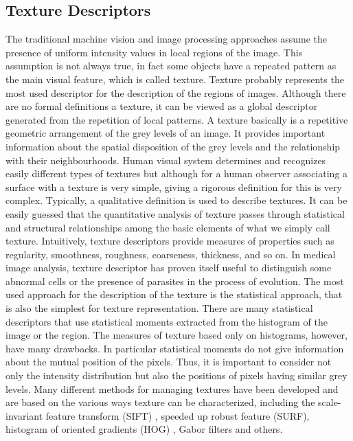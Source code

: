 \documentclass[final,a4paper,12pt,english]{UnicaPhdThesis3}
\begin{document}
\subsection{Texture Descriptors} %
The traditional machine vision and image processing approaches assume the presence of uniform intensity values in local regions of the image. This assumption is not always true, in fact some objects have a repeated pattern as the main visual feature, which is called texture. Texture probably represents the most used descriptor for the description of the regions of images. Although there are no formal definitions a texture, it can be viewed as a global descriptor generated from the repetition of local patterns. A texture basically is a repetitive geometric arrangement of the grey levels of an image. It provides important information about the spatial disposition of the grey levels and the relationship with their neighbourhoods. Human visual system determines and recognizes easily different types of textures but although for a human observer associating a surface with a texture is very simple, giving a rigorous definition for this is very complex. Typically, a qualitative definition is used to describe textures. It can be easily guessed that the quantitative analysis of texture passes through statistical and structural relationships among the basic elements of what we simply call texture. Intuitively, texture descriptors provide measures of properties such as regularity, smoothness, roughness, coarseness, thickness, and so on. In medical image analysis, texture descriptor has proven itself useful to distinguish some abnormal cells or the presence of parasites in the process of evolution. The most used approach for the description of the texture is the statistical approach, that is also the simplest for texture representation. There are many statistical descriptors that use statistical moments extracted from the histogram of the image or the region. The measures of texture based only on histograms, however, have many drawbacks. In particular statistical moments do not give information about the mutual position of the pixels. Thus, it is important to consider not only the intensity distribution but also the positions of pixels having similar grey levels. Many different methods for managing textures have been developed and are based on the various ways texture can be characterized, including the scale-invariant feature transform (SIFT) \cite{Lowe}, speeded up robust feature (SURF)\cite{Bay}, histogram of oriented gradients (HOG) \cite{Dalal}, Gabor filters \cite{Jain} and others.
\end{document}
